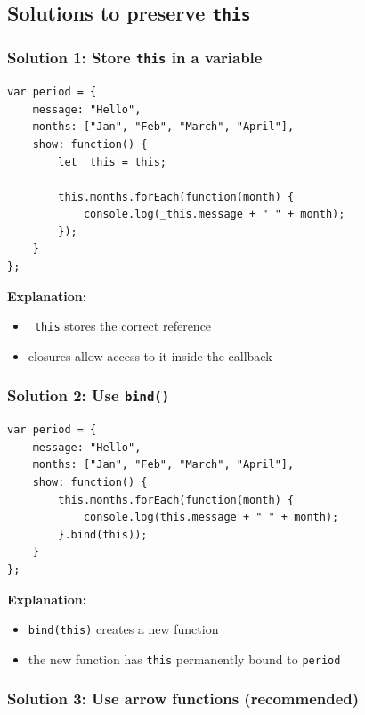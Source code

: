 \documentclass{scrbook}
\begin{document}
\subsection{Solutions to preserve \texttt{this}}

\subsubsection{Solution 1: Store \texttt{this} in a variable}

\begin{lstlisting}
var period = {
    message: "Hello",
    months: ["Jan", "Feb", "March", "April"],
    show: function() {
        let _this = this;

        this.months.forEach(function(month) {
            console.log(_this.message + " " + month);
        });
    }
};
\end{lstlisting}

\textbf{Explanation:}
\begin{itemize}
    \item \texttt{\_this} stores the correct reference
    \item closures allow access to it inside the callback
\end{itemize}

\subsubsection{Solution 2: Use \texttt{bind()}}

\begin{lstlisting}
var period = {
    message: "Hello",
    months: ["Jan", "Feb", "March", "April"],
    show: function() {
        this.months.forEach(function(month) {
            console.log(this.message + " " + month);
        }.bind(this));
    }
};
\end{lstlisting}

\textbf{Explanation:}
\begin{itemize}
    \item \texttt{bind(this)} creates a new function
    \item the new function has \texttt{this} permanently bound to \texttt{period}
\end{itemize}

\subsubsection{Solution 3: Use arrow functions (recommended)}
\end{document}
